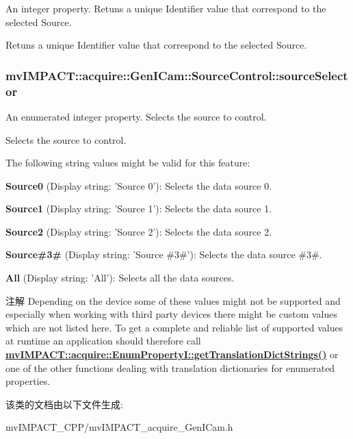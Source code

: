 An integer property. Retuns a unique Identifier value that correspond to the selected Source. 

Retuns a unique Identifier value that correspond to the selected Source. \hypertarget{classmv_i_m_p_a_c_t_1_1acquire_1_1_gen_i_cam_1_1_source_control_ae497dbadb257fb930ace8ad92c36cfea}{
\subsubsection[{source\+Selector}]{ mv\+I\+M\+P\+A\+C\+T\+::acquire\+::\+Gen\+I\+Cam\+::\+Source\+Control\+::source\+Selector}}\label{classmv_i_m_p_a_c_t_1_1acquire_1_1_gen_i_cam_1_1_source_control_ae497dbadb257fb930ace8ad92c36cfea}


An enumerated integer property. Selects the source to control. 

Selects the source to control.

The following string values might be valid for this feature\+:
\begin{DoxyItemize}
\item {\bfseries Source0} (Display string\+: 'Source 0')\+: Selects the data source 0.
\item {\bfseries Source1} (Display string\+: 'Source 1')\+: Selects the data source 1.
\item {\bfseries Source2} (Display string\+: 'Source 2')\+: Selects the data source 2.
\item {\bfseries Source\#3\#} (Display string\+: 'Source \#3\#')\+: Selects the data source \#3\#.
\item {\bfseries All} (Display string\+: 'All')\+: Selects all the data sources.
\end{DoxyItemize}

\begin{DoxyNote}{注解}
Depending on the device some of these values might not be supported and especially when working with third party devices there might be custom values which are not listed here. To get a complete and reliable list of supported values at runtime an application should therefore call {\bfseries \hyperlink{classmv_i_m_p_a_c_t_1_1acquire_1_1_enum_property_i_a0ba6ccbf5ee69784d5d0b537924d26b6}{mv\+I\+M\+P\+A\+C\+T\+::acquire\+::\+Enum\+Property\+I\+::get\+Translation\+Dict\+Strings()}} or one of the other functions dealing with translation dictionaries for enumerated properties. 
\end{DoxyNote}


该类的文档由以下文件生成\+:\begin{DoxyCompactItemize}
\item 
mv\+I\+M\+P\+A\+C\+T\+\_\+\+C\+P\+P/mv\+I\+M\+P\+A\+C\+T\+\_\+acquire\+\_\+\+Gen\+I\+Cam.\+h\end{DoxyCompactItemize}
